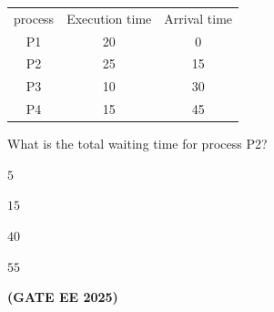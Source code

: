 \documentclass[journal,12pt,onecolumn]{IEEEtran}
\theoremstyle{remark}
\begin{document}
\begin{enumerate}
\begin{tabular}{c c c}
   
     process & Execution time & Arrival time\\
     P1 & 20 & 0 \\
     P2 & 25  & 15 \\
     P3 & 10 & 30 \\
     P4 & 15 & 45 \\
      \end{tabular}  
      \newline
      What is the total waiting time for process P2?
      \begin{enumerate}
          \begin{multicols}{4}
          \item $5$
          \item $15$
          \item $40$
          \item $55$
              
          \end{multicols}
      \end{enumerate}
\hfill \textbf{(GATE EE 2025)}
 

\end{enumerate}
\end{document}
